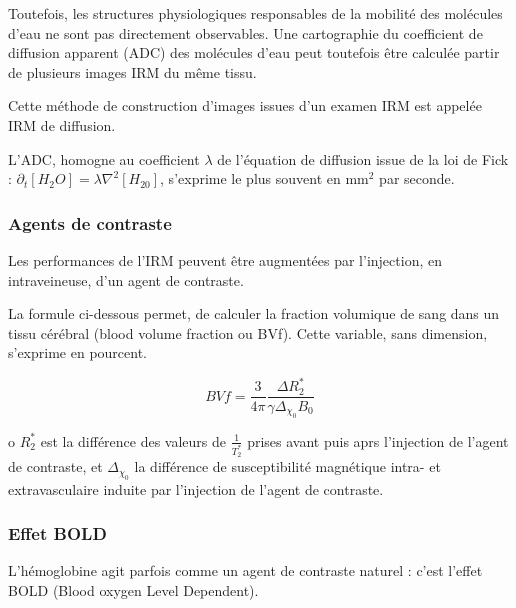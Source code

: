 \par
Toutefois, les structures physiologiques responsables de la mobilit\'e des mol\'ecules d'eau ne sont pas directement observables. %
Une cartographie du coefficient de diffusion apparent (ADC) des mol\'ecules d'eau peut toutefois \^etre calcul\'ee  partir de plusieurs images IRM du m\^eme tissu.

\par
Cette m\'ethode de construction d'images issues d'un examen IRM est appel\'ee IRM de diffusion.

\par
L'ADC, homogne au coefficient $\lambda$ de l'\'equation de diffusion issue de la loi de Fick : $\partial_t [H_2O]=\lambda \nabla^2 [H_20]$, %
s'exprime le plus souvent en mm${}^2$ par seconde.

\subsubsection{Agents de contraste}

Les performances de l'IRM peuvent \^etre augment\'ees par l'injection, en intraveineuse, d'un agent de contraste.

\par
La formule ci-dessous permet, de calculer la fraction volumique de sang dans un tissu c\'er\'ebral (blood volume fraction ou BVf). %
Cette variable, sans dimension, s'exprime en pourcent.

\begin{equation}
BVf=\frac{3}{4\pi}\frac{\Delta R_2^{\ast}}{\gamma \Delta_{\chi_0}B_0}
\label{bvf_gd}
\end{equation}

o $R_2^{\ast}$ est la diff\'erence des valeurs de $\frac{1}{T_2^{\ast}}$ prises avant puis aprs l'injection de l'agent de contraste, %
et $\Delta_{\chi_0}$ la diff\'erence de susceptibilit\'e magn\'etique intra- et extravasculaire induite par l'injection de l'agent de contraste.

\subsubsection{Effet BOLD}

L'h\'emoglobine agit parfois comme un agent de contraste naturel : c'est l'effet BOLD (Blood oxygen Level Dependent).

